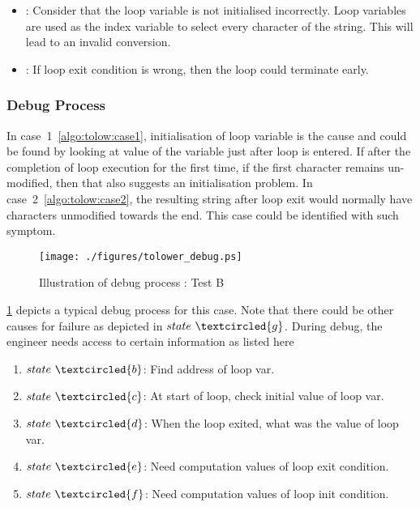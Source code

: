\begin{itemize}

\item [Case 1]: Consider that the loop variable is not initialised incorrectly. Loop variables are used as the index variable to select every character of the string. This will lead to an invalid conversion. \label{algo:tolow:case1}

\item [Case 2]: If loop exit condition is wrong, then the loop could terminate early. \label{algo:tolow:case2}
\end{itemize}

\subsubsection{Debug Process}

In case~1~\ref{algo:tolow:case1}, initialisation of loop variable is the cause and could be found by looking at value of the variable just after loop is entered. If after the completion of loop execution for the first time, if the first character remains un-modified, then that also suggests an initialisation problem.
In case~2~\ref{algo:tolow:case2}, the resulting string after loop exit would normally have characters unmodified towards the end. This case could be identified with such symptom.

\begin{figure}[h]
\centering
\texttt{[image: ./figures/tolower\_debug.ps]}
\caption{Illustration of debug process : Test B} 
\label{fig:tolower_debug.ps}
\end{figure}

\figurename{\ref{fig:tolower_debug.ps}} depicts a typical debug process for this case. Note that there could be other causes for failure as depicted in $state~\textcircled{g}$. During debug, the engineer needs access to certain information as listed here

\begin{enumerate}
\item $state~\textcircled{b}$: Find address of loop var.
\item $state~\textcircled{c}$: At start of loop, check initial value of loop var.
\item $state~\textcircled{d}$: When the loop exited, what was the value of loop var.
\item $state~\textcircled{e}$: Need computation values of loop exit condition.
\item $state~\textcircled{f}$: Need computation values of loop init condition.
\end{enumerate}

